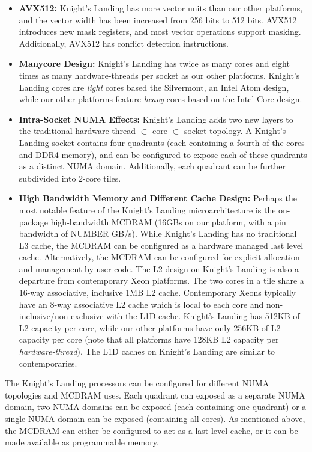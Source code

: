 \documentclass{sig-alternate-05-2015}
\begin{document}
\begin{itemize}
\item \textbf{AVX512:} Knight's Landing has more vector units than our other
platforms, and the vector width has been increased from 256 bits to 512 bits.
AVX512 introduces new mask registers, and most vector operations support
masking. Additionally, AVX512 has conflict detection instructions. 
\item \textbf{Manycore Design:} Knight's Landing has twice as many
cores and eight times as many hardware-threads per socket as our
other platforms. Knight's Landing cores are \emph{light} cores based the Silvermont,
an Intel Atom design, while our other platforms feature \emph{heavy} cores based on
the Intel Core design.
\item \textbf{Intra-Socket NUMA Effects:} Knight's Landing adds two new layers
to the traditional hardware-thread \(\subset\) core \(\subset\) socket
topology. A Knight's Landing socket contains four quadrants (each containing a
fourth of the cores and DDR4 memory), and can be configured to expose each of
these quadrants as a distinct NUMA domain. Additionally, each quadrant can be
further subdivided into 2-core tiles.
\item \textbf{High Bandwidth Memory and Different Cache Design:}
Perhaps the most notable feature of the Knight's Landing microarchitecture is the
on-package high-bandwidth MCDRAM (16GBs on our platform, with a pin bandwidth
of NUMBER GB/s). While Knight's Landing has no traditional L3 cache, the MCDRAM
can be configured as a hardware managed last level cache. Alternatively, the MCDRAM
can be configured for explicit allocation and management by user code. The L2 
design on Knight's Landing is also a departure from contemporary Xeon platforms.
The two cores in a tile share a 16-way associative, inclusive 1MB L2 cache.
Contemporary Xeons typically have an 8-way associative L2 cache which is local
to each core and non-inclusive/non-exclusive with the L1D cache. Knight's
Landing has 512KB of L2 capacity per core, while our other platforms have only
256KB of L2 capacity per core (note that all platforms have 128KB L2 capacity
per \emph{hardware-thread}). The L1D caches on Knight's Landing are similar to
contemporaries.
\end{itemize}

The Knight's Landing processors can be configured for different NUMA topologies
and MCDRAM uses. Each quadrant can exposed as a separate NUMA domain, two NUMA
domains can be exposed (each containing one quadrant) or a single NUMA domain
can be exposed (containing all cores). As mentioned above, the MCDRAM can either
be configured to act as a last level cache, or it can be made available as
programmable memory.
\end{document}
